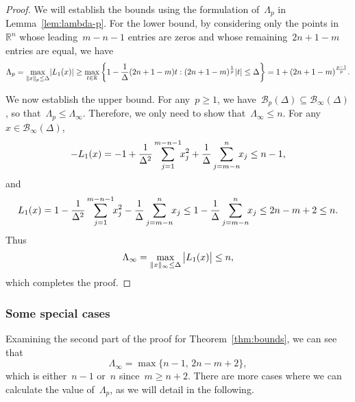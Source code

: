 \documentclass{article}
\numberwithin{equation}{section}
\theoremstyle{definition}
\theoremstyle{plain}
\theoremstyle{remark}
\newcommand*{\abs}[2][]{#1\lvert#2#1\rvert}
\newcommand*{\lagp}[1][]{L\ifblank{#1}{}{_{#1}}}
\newcommand*{\norm}[2][]{#1\lVert#2#1\rVert}
\newcommand*{\R}{\mathbb{R}}
\newcommand*{\set}[2][]{#1\{#2#1\}}
\begin{document}
\begin{proof}
    We will establish the bounds using the formulation of~$\Lambda_p$ in Lemma~\ref{lem:lambda-p}.
    For the lower bound, by considering only the points in~$\R^n$ whose leading~$m - n - 1$ entries are zeros and whose remaining~$2n + 1 - m$ entries are equal, we have
    \begin{equation*}
        \Lambda_p = \max_{\norm{x}_p\le \Delta}\abs{\lagp[1](x)} \ge \max_{t \in \R} \set[\bigg]{1 - \frac{1}{\Delta} (2n + 1 - m) t : (2n + 1 - m)^{\frac{1}{p}}\abs{t} \le \Delta} = 1 + (2n + 1 - m)^{\frac{p - 1}{p}}.
    \end{equation*}

    We now establish the upper bound.
    For any~$p \ge 1$, we have~$\mathcal{B}_p(\Delta) \subseteq \mathcal{B}_{\infty}(\Delta)$, so that~$\Lambda_p \le \Lambda_{\infty}$.
    Therefore, we only need to show that~$\Lambda_{\infty} \le n$. For any~$x \in \mathcal{B}_{\infty}(\Delta)$,
    \begin{equation*}
        -\lagp[1](x) = -1 + \frac{1}{\Delta^2} \sum_{j = 1}^{m - n - 1} \!\! x_j^2 + \frac{1}{\Delta} \sum_{j = m - n}^n \!\! x_j \le n-1,
    \end{equation*}
    and
    \begin{equation*}
        \lagp[1](x) = 1 - \frac{1}{\Delta^2} \sum_{j = 1}^{m - n - 1} \!\! x_j^2 - \frac{1}{\Delta} \sum_{j = m - n}^n \!\! x_j
        \le 1 -  \frac{1}{\Delta} \sum_{j = m - n}^n \!\! x_j \le 2n-m+2 \le n.
    \end{equation*}
    Thus
    \begin{equation*}
        \Lambda_{\infty} =
        \max_{\norm{x}_{\infty} \le \Delta} \abs[\big]{\lagp[1](x)} \le n,
    \end{equation*}
    which completes the proof.
\end{proof}

\subsubsection{Some special cases}

Examining the second part of the proof for Theorem~\ref{thm:bounds}, we can see that
\begin{equation*}
    \Lambda_\infty = \max\{n-1,\, 2n-m+2\},
\end{equation*}
which is either~$n-1$ or~$n$ since~$m\ge n+2$.
There are more cases where we can calculate the value of~$\Lambda_p$, as we will detail in the following.
\end{document}
